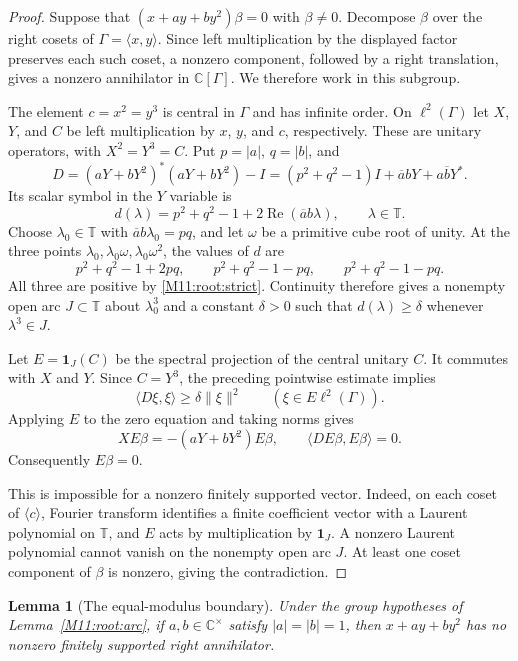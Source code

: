 \documentclass[11pt,a4paper,oneside]{report}
\newtheorem{lemma}[theorem]{Lemma}
\theoremstyle{definition}
\theoremstyle{remark}
\newcommand{\C}{\mathbb C}
\newcommand{\T}{\mathbb T}
\begin{document}
\begin{proof}
Suppose that $(x+ay+by^2)\beta=0$ with $\beta\ne0$.  Decompose $\beta$
over the right cosets of $\Gamma=\langle x,y\rangle$.  Since left
multiplication by the displayed factor preserves each such coset,
a nonzero component, followed by a right translation, gives a nonzero
annihilator in $\C[\Gamma]$.  We therefore work in this subgroup.

The element $c=x^2=y^3$ is central in $\Gamma$ and has infinite order.
On $\ell^2(\Gamma)$ let $X$, $Y$, and $C$ be left multiplication by
$x$, $y$, and $c$, respectively.  These are unitary operators, with
$X^2=Y^3=C$.  Put $p=|a|$, $q=|b|$, and
\[
 D=(aY+bY^2)^*(aY+bY^2)-I
   =(p^2+q^2-1)I+\overline a bY+a\overline bY^*.
\]
Its scalar symbol in the $Y$ variable is
\[
 d(\lambda)=p^2+q^2-1+2\operatorname{Re}(\overline a b\lambda),
 \qquad \lambda\in\T.
\]
Choose $\lambda_0\in\T$ with $\overline a b\lambda_0=pq$, and let
$\omega$ be a primitive cube root of unity.  At the three points
$\lambda_0,\lambda_0\omega,\lambda_0\omega^2$, the values of $d$ are
\[
 p^2+q^2-1+2pq,\qquad
 p^2+q^2-1-pq,\qquad
 p^2+q^2-1-pq.
\]
All three are positive by \eqref{M11:root:strict}.  Continuity therefore
gives a nonempty open arc $J\subset\T$ about $\lambda_0^3$ and a
constant $\delta>0$ such that $d(\lambda)\ge\delta$ whenever
$\lambda^3\in J$.

Let $E=\mathbf1_J(C)$ be the spectral projection of the central unitary
$C$.  It commutes with $X$ and $Y$.  Since $C=Y^3$, the preceding
pointwise estimate implies
\[
 \langle D\xi,\xi\rangle\ge\delta\|\xi\|^2
 \qquad (\xi\in E\ell^2(\Gamma)).
\]
Applying $E$ to the zero equation and taking norms gives
\[
 XE\beta=-(aY+bY^2)E\beta,
 \qquad \langle DE\beta,E\beta\rangle=0.
\]
Consequently $E\beta=0$.

This is impossible for a nonzero finitely supported vector.  Indeed,
on each coset of $\langle c\rangle$, Fourier transform identifies a
finite coefficient vector with a Laurent polynomial on $\T$, and
$E$ acts by multiplication by $\mathbf1_J$.  A nonzero Laurent
polynomial cannot vanish on the nonempty open arc $J$.  At least one
coset component of $\beta$ is nonzero, giving the contradiction.
\end{proof}

\begin{lemma}[The equal-modulus boundary]
\label{M11:root:boundary}
Under the group hypotheses of Lemma~\ref{M11:root:arc}, if
$a,b\in\C^\times$ satisfy $|a|=|b|=1$, then $x+ay+by^2$ has no
nonzero finitely supported right annihilator.
\end{lemma}
\end{document}
